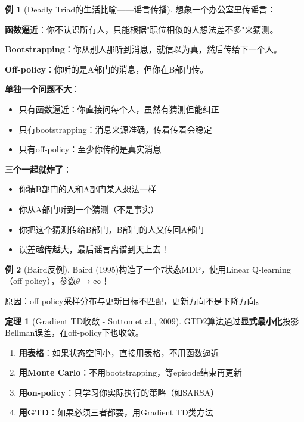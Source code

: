 \documentclass[11pt,a4paper]{article}
\theoremstyle{definition}
\newtheorem{example}{例}[section]
\newtheorem{theorem}{定理}[section]
\begin{document}
\begin{example}[Deadly Triad的生活比喻——谣言传播]
想象一个办公室里传谣言：

\textbf{函数逼近}：你不认识所有人，只能根据"职位相似的人想法差不多"来猜测。

\textbf{Bootstrapping}：你从别人那听到消息，就信以为真，然后传给下一个人。

\textbf{Off-policy}：你听的是A部门的消息，但你在B部门传。

\textbf{单独一个问题不大}：
\begin{itemize}
    \item 只有函数逼近：你直接问每个人，虽然有猜测但能纠正
    \item 只有bootstrapping：消息来源准确，传着传着会稳定
    \item 只有off-policy：至少你传的是真实消息
\end{itemize}

\textbf{三个一起就炸了}：
\begin{itemize}
    \item 你猜B部门的人和A部门某人想法一样
    \item 你从A部门听到一个猜测（不是事实）
    \item 你把这个猜测传给B部门，B部门的人又传回A部门
    \item 误差越传越大，最后谣言离谱到天上去！
\end{itemize}
\end{example}

\begin{example}[Baird反例]
Baird (1995)构造了一个7状态MDP，使用Linear Q-learning（off-policy），参数$\theta \to \infty$！

原因：off-policy采样分布与更新目标不匹配，更新方向不是下降方向。
\end{example}

\begin{theorem}[Gradient TD收敛 - Sutton et al., 2009]
GTD2算法通过\textbf{显式最小化}投影Bellman误差，在off-policy下也收敛。
\end{theorem}

\begin{plainwords}
\begin{enumerate}
    \item \textbf{用表格}：如果状态空间小，直接用表格，不用函数逼近
    \item \textbf{用Monte Carlo}：不用bootstrapping，等episode结束再更新
    \item \textbf{用on-policy}：只学习你实际执行的策略（如SARSA）
    \item \textbf{用GTD}：如果必须三者都要，用Gradient TD类方法
\end{enumerate}
\end{plainwords}
\end{document}
